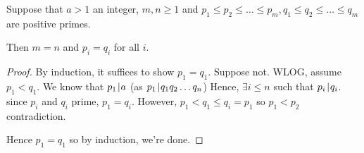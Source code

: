 \documentclass[notes.tex]{subfiles}
\begin{document}
\begin{theorem} 
	Suppose that $a > 1$ an integer, $m, n \ge 1$ and $p_1 \le p_2 \le \ldots \le p_m,  q_1 \le q_2\le \ldots \le q_m$ are positive primes.
\end{theorem}

Then $m=n$ and $p_i=q_i$ for all $i$.
\begin{proof}
	By induction, it suffices to show $p_1 = q_1$. Suppose not.
WLOG, assume $p_1 < q_1$. We know that $p_1\mkern2mu|\mkern1mu a$ (as $p_1\mkern2mu|\mkern1mu q_1q_2\ldots q_n$) Hence, $\exists i\le n$ such that $p_i \mkern2mu|\mkern1mu q_i$. since $p_i$ and $q_i$ prime, $p_1 = q_i$. However, $p_1 < q_1 \le q_i = p_1$ so $p_1 < p_2$ contradiction.

Hence $p_1 = q_1$ so by induction, we're done.
\end{proof}
\end{document}
